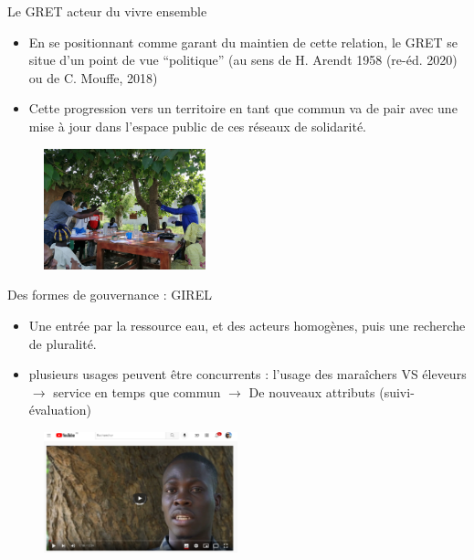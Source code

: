 \documentclass[newPxFont]{beamer}
\begin{document}
\begin{frame}[c]{Le GRET acteur du vivre ensemble}
\vspace{-1cm}

\begin{itemize}
    \item En se positionnant comme garant du maintien de cette relation, le GRET se situe d’un point de vue “politique” (au sens de H. Arendt 1958 (re-éd. 2020) ou de C. Mouffe, 2018)
    \item Cette progression vers un territoire en tant que commun va de pair avec une mise à jour dans l’espace public de ces réseaux de solidarité.
\end{itemize}
\begin{figure}
    \includegraphics[height=3.5cm]{img/atelier_montroland.jpg}
\end{figure}
\end{frame}


\begin{frame}[c]{Des formes de gouvernance : GIREL}
\vspace{-1cm}
\begin{itemize}
    \item Une entrée par la ressource eau, et des acteurs homogènes, puis une recherche de pluralité.
    \item plusieurs usages peuvent être concurrents : l’usage des maraîchers VS éleveurs $\rightarrow$ service en temps que commun $\rightarrow$ De nouveaux attributs (suivi-évaluation)
\end{itemize}
\begin{figure}
    \includegraphics[height=3.5cm]{img/ComMod_f'eauDiem.png}
\end{figure}

\end{frame}
\end{document}
